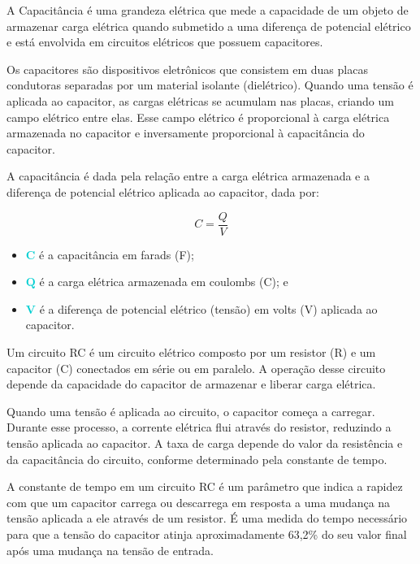 \documentclass[11pt,a4paper]{article}
\newcounter{exemplo}
\begin{document}
			A Capacitância é uma grandeza elétrica que mede a capacidade de um objeto de armazenar carga elétrica quando submetido a uma diferença de potencial elétrico e está envolvida em circuitos elétricos que possuem capacitores.
			
			Os capacitores são dispositivos eletrônicos que consistem em duas placas condutoras separadas por um material isolante (dielétrico). Quando uma tensão é aplicada ao capacitor, as cargas elétricas se acumulam nas placas, criando um campo elétrico entre elas. Esse campo elétrico é proporcional à carga elétrica armazenada no capacitor e inversamente proporcional à capacitância do capacitor.

			A capacitância é dada pela relação entre a carga elétrica armazenada e a diferença de potencial elétrico aplicada ao capacitor, dada por:

				\begin{equation}
					C = \frac{Q}{V}
				\end{equation}

				\begin{exemplo}[onde,]
					\begin{itemize}
						\item \textcolor{DarkTurquoise}{$\mathbf{C}$} é a capacitância em farads (F);
						\item \textcolor{DarkTurquoise}{$\mathbf{Q}$} é a carga elétrica armazenada em coulombs (C); e 
						\item \textcolor{DarkTurquoise}{$\mathbf{V}$} é a diferença de potencial elétrico (tensão) em volts (V) aplicada ao capacitor.
					\end{itemize}
				\end{exemplo}
			
			Um circuito RC é um circuito elétrico composto por um resistor (R) e um capacitor (C) conectados em série ou em paralelo. A operação desse circuito depende da capacidade do capacitor de armazenar e liberar carga elétrica.

			Quando uma tensão é aplicada ao circuito, o capacitor começa a carregar. Durante esse processo, a corrente elétrica flui através do resistor, reduzindo a tensão aplicada ao capacitor. A taxa de carga depende do valor da resistência e da capacitância do circuito, conforme determinado pela constante de tempo.

			A constante de tempo em um circuito RC é um parâmetro que indica a rapidez com que um capacitor carrega ou descarrega em resposta a uma mudança na tensão aplicada a ele através de um resistor. É uma medida do tempo necessário para que a tensão do capacitor atinja aproximadamente 63,2\% do seu valor final após uma mudança na tensão de entrada.
\end{document}
